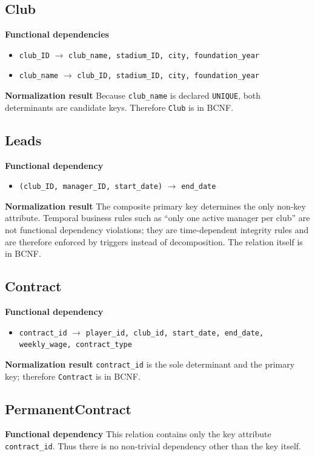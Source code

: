 \documentclass[12pt,a4paper]{article}
\begin{document}
\subsection{Club}
\textbf{Functional dependencies}
\begin{itemize}
    \item \texttt{club\_ID} $\rightarrow$ \texttt{club\_name, stadium\_ID, city, foundation\_year}
    \item \texttt{club\_name} $\rightarrow$ \texttt{club\_ID, stadium\_ID, city, foundation\_year}
\end{itemize}
\textbf{Normalization result} Because \texttt{club\_name} is declared \texttt{UNIQUE}, both determinants are candidate keys. Therefore \texttt{Club} is in BCNF.

\subsection{Leads}
\textbf{Functional dependency}
\begin{itemize}
    \item \texttt{(club\_ID, manager\_ID, start\_date)} $\rightarrow$ \texttt{end\_date}
\end{itemize}
\textbf{Normalization result} The composite primary key determines the only non-key attribute. Temporal business rules such as ``only one active manager per club'' are not functional dependency violations; they are time-dependent integrity rules and are therefore enforced by triggers instead of decomposition. The relation itself is in BCNF.

\subsection{Contract}
\textbf{Functional dependency}
\begin{itemize}
    \item \texttt{contract\_id} $\rightarrow$ \texttt{player\_id, club\_id, start\_date, end\_date, weekly\_wage, contract\_type}
\end{itemize}
\textbf{Normalization result} \texttt{contract\_id} is the sole determinant and the primary key; therefore \texttt{Contract} is in BCNF.

\subsection{PermanentContract}
\textbf{Functional dependency} This relation contains only the key attribute \texttt{contract\_id}. Thus there is no non-trivial dependency other than the key itself.
\end{document}
